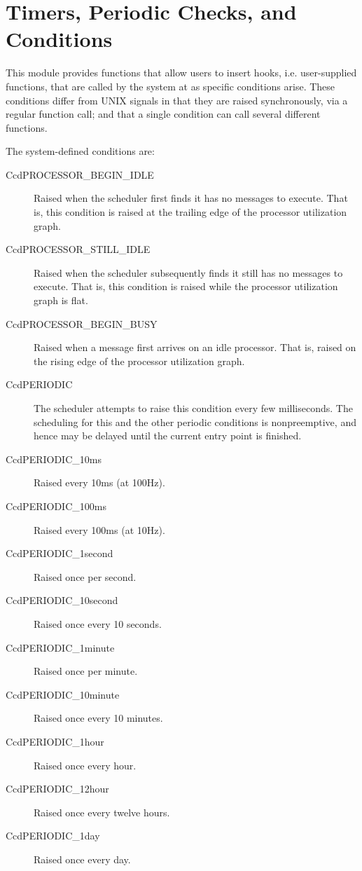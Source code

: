 \chapter{Timers, Periodic Checks, and Conditions}

This module provides functions that allow users to insert hooks,
i.e. user-supplied functions, that are called by the system at
as specific conditions arise.  These conditions differ from UNIX
signals in that they are raised synchronously, via a regular
function call; and that a single condition can call several 
different functions.  

The system-defined conditions are:
\begin{description}
\item[CcdPROCESSOR\_BEGIN\_IDLE] Raised when the scheduler first
finds it has no messages to execute.  That is, this condition is
raised at the trailing edge of the processor utilization graph.
\item[CcdPROCESSOR\_STILL\_IDLE] Raised when the scheduler subsequently
finds it still has no messages to execute.  That is, this condition is
raised while the processor utilization graph is flat.
\item[CcdPROCESSOR\_BEGIN\_BUSY] Raised when a message first arrives
on an idle processor.  That is, raised on the rising edge of the
processor utilization graph.
\item[CcdPERIODIC] The scheduler attempts to raise this condition every
few milliseconds.  The scheduling for this and the other periodic conditions
is nonpreemptive, and hence may be delayed until the current entry point is 
finished.
\item[CcdPERIODIC\_10ms] Raised every 10ms (at 100Hz).
\item[CcdPERIODIC\_100ms] Raised every 100ms (at 10Hz).
\item[CcdPERIODIC\_1second] Raised once per second.
\item[CcdPERIODIC\_10second] Raised once every 10 seconds.
\item[CcdPERIODIC\_1minute] Raised once per minute.
\item[CcdPERIODIC\_10minute] Raised once every 10 minutes.
\item[CcdPERIODIC\_1hour] Raised once every hour.
\item[CcdPERIODIC\_12hour] Raised once every twelve hours.
\item[CcdPERIODIC\_1day] Raised once every day.


\end{description}
